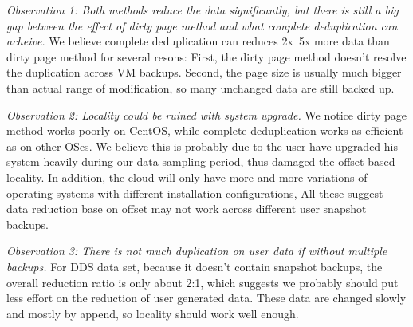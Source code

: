 \emph{Observation 1: Both methods reduce the data significantly, 
but there is still a big gap between the effect of dirty page method 
and what complete deduplication can acheive.} 
We believe complete deduplication can reduces 2x~5x more data than dirty page method for several resons:
First, the dirty page method doesn't resolve the duplication across VM backups. Second, the page size
is usually much bigger than actual range of modification, so many unchanged data are still backed up.

\emph{Observation 2: Locality could be ruined with system upgrade.}
We notice dirty page method works poorly on CentOS, while complete deduplication works as efficient as on
other OSes. We believe this is probably due to the user have upgraded his system heavily during our
data sampling period, thus damaged the offset-based locality. In addition, the cloud will only have
more and more variations of operating systems with different installation configurations,
All these suggest data reduction base on offset may not work across different user snapshot backups.

\emph{Observation 3: There is not much duplication on user data if without multiple backups.}
For DDS data set, because it doesn't contain snapshot backups, the overall reduction ratio is only about 2:1,
which suggests we probably should put less effort on the reduction of user generated data. These data
are changed slowly and mostly by append, so locality should work well enough.


